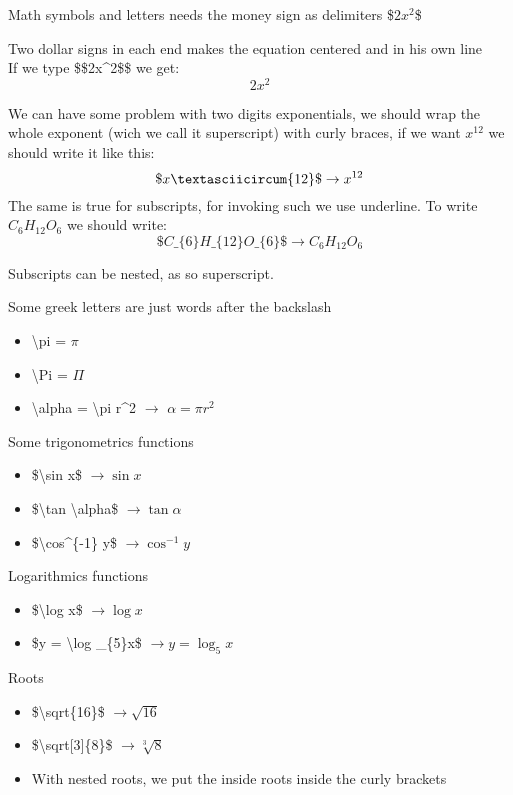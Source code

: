 \documentclass[12pt, a4paper]{article}
\begin{document}
Math symbols and letters needs the money sign as delimiters \$$2x^2$\$

Two dollar signs in each end makes the equation centered and in his own line\\
If we type \$\$2x\textasciicircum 2\$\$ we get: $$2x^2$$

We can have some problem with two digits exponentials, we should wrap the whole exponent (wich we call it superscript) with curly braces, if we want $x^{12}$ we should write it like this: $$\$x\textasciicircum\{12\}\$ \rightarrow x^{12}$$
The same is true for subscripts, for invoking such we use underline. To write $C_{6}H_{12}O_{6}$ we should write: $$\$C\_\{6\}H\_\{12\}O\_\{6\}\$ \rightarrow C_{6}H_{12}O_{6}$$

Subscripts can be nested, as so superscript.

Some greek letters are just words after the backslash

\begin{itemize}
    \item [] \textbackslash pi = $\pi$
    \item [] \textbackslash Pi = $\Pi$
    \item [] \textbackslash alpha = \textbackslash pi r\textasciicircum2 $\rightarrow$ $\alpha = \pi r^{2}$
\end{itemize}

Some trigonometrics functions

\begin{itemize}
    \item [] \$\textbackslash sin x\$ $\rightarrow \sin x$
    \item [] \$\textbackslash tan \textbackslash alpha\$ $\rightarrow \tan \alpha$
    \item [] \$\textbackslash cos\textasciicircum\{-1\} y\$ $\rightarrow \cos^{-1} y$
\end{itemize}

Logarithmics functions

\begin{itemize}
    \item [] \$\textbackslash log x\$ $\rightarrow \log x$
    \item [] \$y = \textbackslash log \_\{5\}x\$ $\rightarrow y = \log_{5} x$
\end{itemize}

Roots

\begin{itemize}
    \item [] \$\textbackslash sqrt\{16\}\$ $\rightarrow \sqrt{16}$
    \item [] \$\textbackslash sqrt$[$3$]$\{8\}\$ $\rightarrow \sqrt[3]{8}$
    \item [] With nested roots, we put the inside roots inside the curly brackets
\end{itemize}
\end{document}
